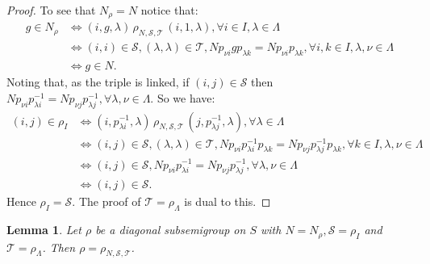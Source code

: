 \documentclass[a4paper, 12pt,reqno]{amsart}
\theoremstyle{plain}
\newtheorem{lemma}[thm]{Lemma}
\theoremstyle{definition}
\theoremstyle{remark}
\newcommand{\normspace}[1]{\, #1 \,}
\begin{document}
\begin{proof}
    To see that $N_\rho = N$ notice that:
    \begin{align*}
        g \in N_\rho & \iff (i,g,\lambda)\normspace{\rho_{N,\mathcal{S},\mathcal{T}}}(i,1,\lambda),\forall i \in I,\lambda \in \Lambda \\
        & \iff (i,i) \in \mathcal{S} , (\lambda,\lambda) \in \mathcal{T} , Np_{\nu i} g p_{\lambda k}= Np_{\nu i}  p_{\lambda k}, \forall i,k \in I,\lambda,\nu \in \Lambda \\
        & \iff g \in N.
    \end{align*}
    Noting that, as the triple is linked, if $(i,j) \in \mathcal{S}$ then $Np_{\nu i} p_{\lambda i}^{-1} = Np_{\nu j}p_{\lambda j}^{-1}, \forall \lambda , \nu \in \Lambda$.
    So we have:
    \begin{align*}
        (i,j) \in \rho_I & \iff (i,p_{\lambda i}^{-1},\lambda) \normspace{\rho_{N , \mathcal{S} , \mathcal{T}}} (j,p_{\lambda j}^{-1},\lambda), \forall \lambda \in \Lambda \\
        & \iff (i,j) \in \mathcal{S}, (\lambda,\lambda) \in \mathcal{T},Np_{\nu i} p_{\lambda i}^{-1} p_{\lambda k} = Np_{\nu j} p_{\lambda j}^{-1} p_{\lambda k} , \forall k \in I , \lambda,\nu \in \Lambda \\
        & \iff (i,j) \in \mathcal{S} , Np_{\nu i} p_{\lambda i}^{-1} = Np_{\nu j} p_{\lambda j}^{-1}, \forall \lambda, \nu \in \Lambda \\
        & \iff (i,j) \in \mathcal{S}.
    \end{align*}
    Hence $\rho_I = \mathcal{S}$.
    The proof of $\mathcal{T} = \rho_\Lambda$ is dual to this.
\end{proof}

\begin{lemma}
    Let $\rho$ be a diagonal subsemigroup on $S$ with $N = N_\rho , \mathcal{S} = \rho_I$ and $\mathcal{T} = \rho_\Lambda$.
    Then $\rho = \rho_{N,\mathcal{S},\mathcal{T}}$.
\end{lemma}
\end{document}
